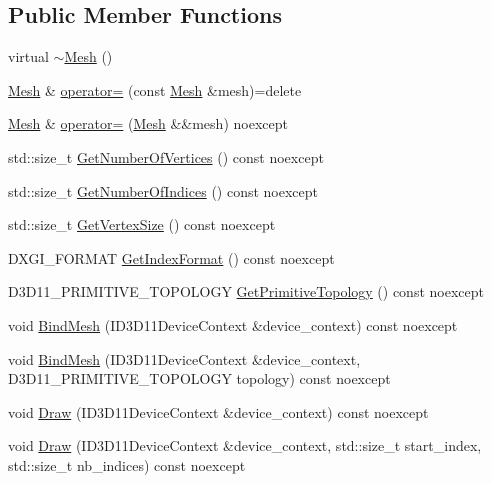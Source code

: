\subsection*{Public Member Functions}
\begin{DoxyCompactItemize}
\item 
virtual \mbox{\hyperlink{classmage_1_1rendering_1_1_mesh_a3f0a53becc293987d7ecf9ca34a230d8}{$\sim$\+Mesh}} ()
\item 
\mbox{\hyperlink{classmage_1_1rendering_1_1_mesh}{Mesh}} \& \mbox{\hyperlink{classmage_1_1rendering_1_1_mesh_a17f6dd40e8eea41b469b475de93ee466}{operator=}} (const \mbox{\hyperlink{classmage_1_1rendering_1_1_mesh}{Mesh}} \&mesh)=delete
\item 
\mbox{\hyperlink{classmage_1_1rendering_1_1_mesh}{Mesh}} \& \mbox{\hyperlink{classmage_1_1rendering_1_1_mesh_ae5bcea1df4c9562bfe30cd247552fe1c}{operator=}} (\mbox{\hyperlink{classmage_1_1rendering_1_1_mesh}{Mesh}} \&\&mesh) noexcept
\item 
std\+::size\+\_\+t \mbox{\hyperlink{classmage_1_1rendering_1_1_mesh_a92d3e120584e8032c54d3040b1333c51}{Get\+Number\+Of\+Vertices}} () const noexcept
\item 
std\+::size\+\_\+t \mbox{\hyperlink{classmage_1_1rendering_1_1_mesh_a82820c8395d4298fdc90bbe60332760a}{Get\+Number\+Of\+Indices}} () const noexcept
\item 
std\+::size\+\_\+t \mbox{\hyperlink{classmage_1_1rendering_1_1_mesh_a8bfbf41d64660994cc807884ef33c9a1}{Get\+Vertex\+Size}} () const noexcept
\item 
D\+X\+G\+I\+\_\+\+F\+O\+R\+M\+AT \mbox{\hyperlink{classmage_1_1rendering_1_1_mesh_a47540e1d5ec5d278862a3d0c0c5db1df}{Get\+Index\+Format}} () const noexcept
\item 
D3\+D11\+\_\+\+P\+R\+I\+M\+I\+T\+I\+V\+E\+\_\+\+T\+O\+P\+O\+L\+O\+GY \mbox{\hyperlink{classmage_1_1rendering_1_1_mesh_af6cead725f7e5352a90a8f8847580f75}{Get\+Primitive\+Topology}} () const noexcept
\item 
void \mbox{\hyperlink{classmage_1_1rendering_1_1_mesh_a36999cc548e68c3ad0c8d348ad0ead4f}{Bind\+Mesh}} (I\+D3\+D11\+Device\+Context \&device\+\_\+context) const noexcept
\item 
void \mbox{\hyperlink{classmage_1_1rendering_1_1_mesh_a35fe2a8fd609c204c70668e3a0a68331}{Bind\+Mesh}} (I\+D3\+D11\+Device\+Context \&device\+\_\+context, D3\+D11\+\_\+\+P\+R\+I\+M\+I\+T\+I\+V\+E\+\_\+\+T\+O\+P\+O\+L\+O\+GY topology) const noexcept
\item 
void \mbox{\hyperlink{classmage_1_1rendering_1_1_mesh_a4a29089e1894662029be09eafe32255b}{Draw}} (I\+D3\+D11\+Device\+Context \&device\+\_\+context) const noexcept
\item 
void \mbox{\hyperlink{classmage_1_1rendering_1_1_mesh_a951143baec3ad21757e679a6d7d6ac71}{Draw}} (I\+D3\+D11\+Device\+Context \&device\+\_\+context, std\+::size\+\_\+t start\+\_\+index, std\+::size\+\_\+t nb\+\_\+indices) const noexcept
\end{DoxyCompactItemize}
